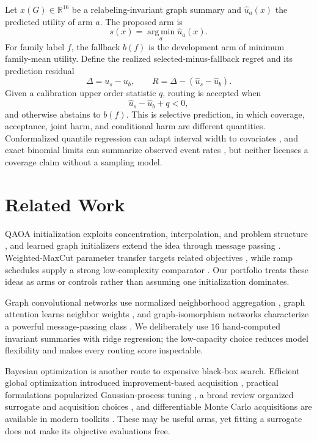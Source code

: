 \documentclass[aps,prx,reprint,superscriptaddress,floatfix]{revtex4-2}
\newcommand{\R}{\mathbb{R}}
\newcommand{\argminop}{\operatorname*{arg\,min}}
\begin{document}
Let $x(G)\in\R^{16}$ be a relabeling-invariant graph summary and
$\widehat u_a(x)$ the predicted utility of arm $a$.  The proposed arm is
\begin{equation}
 s(x)=\argminop_a\widehat u_a(x).
 \label{eq:selected}
\end{equation}
For family label $f$, the fallback $b(f)$ is the development arm of minimum
family-mean utility.  Define the realized selected-minus-fallback regret and its
prediction residual
\begin{equation}
 \Delta=u_s-u_b,
 \qquad
 R=\Delta-(\widehat u_s-\widehat u_b).
 \label{eq:residual}
\end{equation}
Given a calibration upper order statistic $q$, routing is accepted when
\begin{equation}
 \widehat u_s-\widehat u_b+q<0,
 \label{eq:gate}
\end{equation}
and otherwise abstains to $b(f)$.  This is selective prediction, in which
coverage, acceptance, joint harm, and conditional harm are different quantities.
Conformalized quantile regression can adapt interval width to covariates
\citep{romano2019cqr}, and exact binomial limits can summarize observed event
rates \citep{clopper1934fiducial}, but neither licenses a coverage claim without
a sampling model.

\section{Related Work}

QAOA initialization exploits concentration, interpolation, and problem structure
\citep{zhou2020qaoa,brandao2018fixed}, and learned graph initializers extend the
idea through message passing \citep{jain2022gnn}.  Weighted-MaxCut parameter
transfer targets related objectives \citep{shaydulin2023weighted}, while ramp
schedules supply a strong low-complexity comparator \citep{montanez2025ramp}.
Our portfolio treats these ideas as arms or controls rather than assuming one
initialization dominates.

Graph convolutional networks use normalized neighborhood aggregation
\citep{kipf2017gcn}, graph attention learns neighbor weights
\citep{velickovic2018gat}, and graph-isomorphism networks characterize a powerful
message-passing class \citep{xu2019gin}.  We deliberately use $16$ hand-computed
invariant summaries with ridge regression; the low-capacity choice reduces model
flexibility and makes every routing score inspectable.

Bayesian optimization is another route to expensive black-box search.  Efficient
global optimization introduced improvement-based acquisition
\citep{jones1998efficient}, practical formulations popularized Gaussian-process
tuning \citep{snoek2012practical}, a broad review organized surrogate and
acquisition choices \citep{shahriari2016taking}, and differentiable Monte Carlo
acquisitions are available in modern toolkits \citep{balandat2020botorch}.  These
may be useful arms, yet fitting a surrogate does not make its objective
evaluations free.
\end{document}
